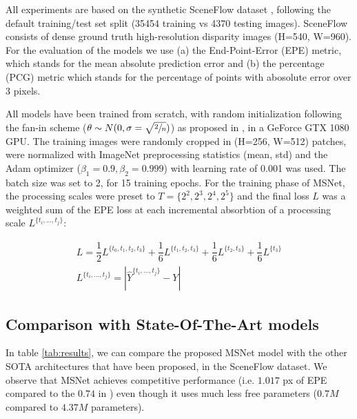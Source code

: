 \documentclass[runningheads]{llncs}
\begin{document}
All experiments are based on the synthetic SceneFlow dataset \cite{MIFDB16}, following the default training/test set split (35454 training vs 4370 testing images). SceneFlow consists of dense ground truth high-resolution disparity images (H=540, W=960). For the evaluation of the models we use (a) the End-Point-Error (EPE) metric, which stands for the mean absolute prediction error and (b) the percentage (PCG) metric which stands for the percentage of points with abosolute error over 3 pixels.

All models have been trained from scratch, with random initialization following the fan-in scheme ($\theta \sim N(0,\sigma=\sqrt{\sfrac{2}{n}})$) as proposed in \cite{He2015}, in a GeForce GTX 1080 GPU. The training images were randomly cropped in (H=256, W=512) patches, were normalized with ImageNet preprocessing statistics (mean, std) and the Adam optimizer ($\beta_1 = 0.9, \beta_2=0.999$) with learning rate of 0.001 was used. The batch size was set to 2, for 15 training epochs. For the training phase of MSNet, the processing scales were preset to $T= \{2^2, 2^3, 2^4, 2^5\}$ and the final loss $L$ was a weighted sum of the EPE loss at each incremental absorbtion of a processing scale $L^{\{t_i, ..., t_j\}} $:


\begin{gather}
L = \dfrac{1}{2}L^{\{t_0, t_1, t_2, t_3\}} +  \dfrac{1}{6}L^{\{t_1, t_2, t_3\}} + \dfrac{1}{6}L^{\{t_2, t_3\}} + \dfrac{1}{6}L^{\{t_3\}}\\
L^{\{t_i, ..., t_j\}} = |\hat{Y}^{\{t_i, ..., t_j\}} - Y |    
\end{gather}{}




\subsection{Comparison with State-Of-The-Art models}

In table \ref{tab:results}, we can compare the proposed MSNet model with the other SOTA architectures that have been proposed, in the SceneFlow dataset. We observe that MSNet achieves competitive performance (i.e. $1.017$ px of EPE compared to the $0.74$ in \cite{du2019amnet}) even though it uses much less free parameters ($0.7M$ compared to $4.37M$ parameters).
\end{document}
